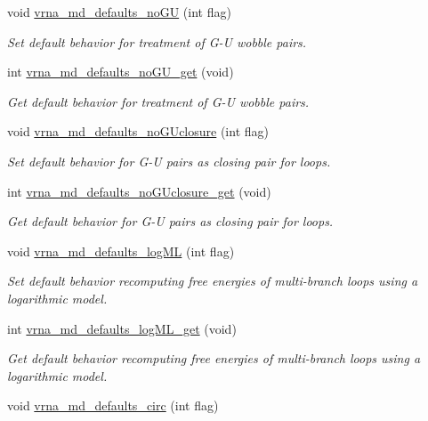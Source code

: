 \begin{DoxyCompactItemize}
void \hyperlink{group__model__details_ga98218f85c7a957a1d1ddf4627fdf5a39}{vrna\+\_\+md\+\_\+defaults\+\_\+no\+GU} (int flag)
\begin{DoxyCompactList}\small\item\em Set default behavior for treatment of G-\/U wobble pairs. \end{DoxyCompactList}\item 
int \hyperlink{group__model__details_ga5faa7d4e536d7fe36ec25428c0cf2563}{vrna\+\_\+md\+\_\+defaults\+\_\+no\+G\+U\+\_\+get} (void)
\begin{DoxyCompactList}\small\item\em Get default behavior for treatment of G-\/U wobble pairs. \end{DoxyCompactList}\item 
void \hyperlink{group__model__details_gade5b9951d71ca2fb357a4e6c0c18ccd1}{vrna\+\_\+md\+\_\+defaults\+\_\+no\+G\+Uclosure} (int flag)
\begin{DoxyCompactList}\small\item\em Set default behavior for G-\/U pairs as closing pair for loops. \end{DoxyCompactList}\item 
int \hyperlink{group__model__details_ga4f7fdad083243a5348d63320ddaa70f3}{vrna\+\_\+md\+\_\+defaults\+\_\+no\+G\+Uclosure\+\_\+get} (void)
\begin{DoxyCompactList}\small\item\em Get default behavior for G-\/U pairs as closing pair for loops. \end{DoxyCompactList}\item 
void \hyperlink{group__model__details_ga3de50a73455d88c3957386933b8e1f90}{vrna\+\_\+md\+\_\+defaults\+\_\+log\+ML} (int flag)
\begin{DoxyCompactList}\small\item\em Set default behavior recomputing free energies of multi-\/branch loops using a logarithmic model. \end{DoxyCompactList}\item 
int \hyperlink{group__model__details_ga93f04e070d529c5d0bb87c9681f6ad29}{vrna\+\_\+md\+\_\+defaults\+\_\+log\+M\+L\+\_\+get} (void)
\begin{DoxyCompactList}\small\item\em Get default behavior recomputing free energies of multi-\/branch loops using a logarithmic model. \end{DoxyCompactList}\item 
void \hyperlink{group__model__details_ga4e1deb3e91a8a99e5c6dd905a5eb0186}{vrna\+\_\+md\+\_\+defaults\+\_\+circ} (int flag)

\end{DoxyCompactItemize}
